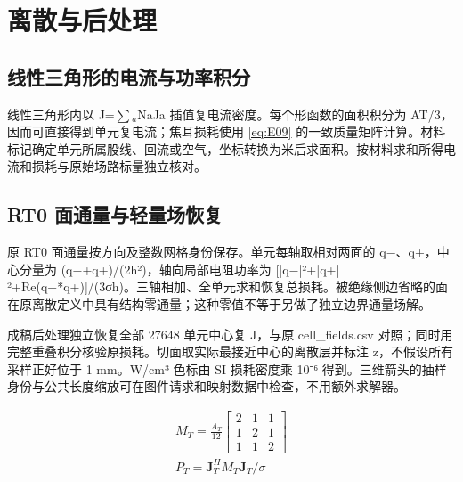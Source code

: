 \section{离散与后处理}
\label{chapter:B}

\hypertarget{B.triangle_derivation.heading}{}
\subsection{线性三角形的电流与功率积分}

\hypertarget{B.triangle_derivation.p1}{}
线性三角形内以 J=\(\sum\)\(_a\)NaJa 插值复电流密度。每个形函数的面积积分为 AT/3，因而可直接得到单元复电流；焦耳损耗使用 \eqref{eq:E09} 的一致质量矩阵计算。材料标记确定单元所属股线、回流或空气，坐标转换为米后求面积。按材料求和所得电流和损耗与原始场路标量独立核对。

\hypertarget{B.report_rt0.heading}{}
\subsection{RT0 面通量与轻量场恢复}

\hypertarget{B.report_rt0.p1}{}
原 RT0 面通量按方向及整数网格身份保存。单元每轴取相对两面的 q−、q+，中心分量为 (q−+q+)/(2h²)，轴向局部电阻功率为 [|q−|²+|q+|²+Re(q−*q+)]/(3σh)。三轴相加、全单元求和恢复总损耗。被绝缘侧边省略的面在原离散定义中具有结构零通量；这种零值不等于另做了独立边界通量场解。

\hypertarget{B.report_rt0.p2}{}
成稿后处理独立恢复全部 27648 单元中心复 J，与原 cell\_fields.csv 对照；同时用完整重叠积分核验原损耗。切面取实际最接近中心的离散层并标注 z，不假设所有采样正好位于 1 mm。W/cm³ 色标由 SI 损耗密度乘 10⁻⁶ 得到。三维箭头的抽样身份与公共长度缩放可在图件请求和映射数据中检查，不用额外求解器。

\hypertarget{B.equation.E09}{}
\hypertarget{E09}{}
\begin{equation}
\begin{gathered}
M_T=\frac{A_T}{12}\begin{bmatrix}2&1&1\\1&2&1\\1&1&2\end{bmatrix} \\
P_T=\mathbf J_T^H M_T\mathbf J_T/\sigma
\end{gathered}
\tag{9}\label{eq:E09}
\end{equation}
